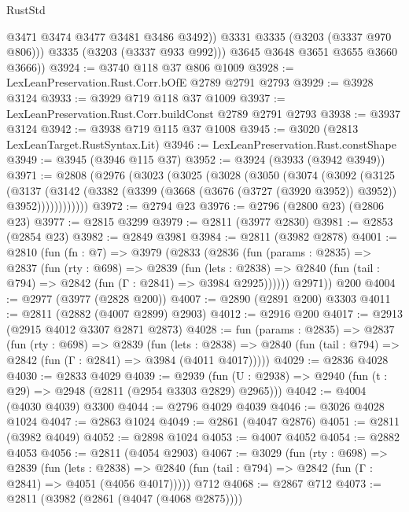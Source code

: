 \begin{lexlean}{RustStd}
\begin{coremodule}
                @3471
                @3474
                @3477
                @3481
                @3486
                @3492))
            @3331
            @3335
            (@3203 (@3337 @970 @806)))
          @3335
          (@3203 (@3337 @933 @992)))
        @3645
        @3648
        @3651
        @3655
        @3660
        @3666))
@3924 := @3740 @118 @37 @806 @1009
@3928 := LexLeanPreservation.Rust.Corr.bOfE @2789 @2791 @2793
@3929 := @3928 @3124
@3933 := @3929 @719 @118 @37 @1009
@3937 := LexLeanPreservation.Rust.Corr.buildConst @2789 @2791 @2793
@3938 := @3937 @3124
@3942 := @3938 @719 @115 @37 @1008
@3945 := @3020 (@2813 LexLeanTarget.RustSyntax.Lit)
@3946 := LexLeanPreservation.Rust.constShape
@3949 := @3945 (@3946 @115 @37)
@3952 := @3924 (@3933 (@3942 @3949))
@3971 := @2808
    (@2976
      (@3023
        (@3025
          (@3028
            (@3050
              (@3074
                (@3092
                  (@3125
                    (@3137
                      (@3142
                        (@3382 (@3399 (@3668 (@3676 (@3727 (@3920 @3952)) @3952)) @3952))))))))))))
@3972 := @2794 @23
@3976 := @2796 (@2800 @23) (@2806 @23)
@3977 := @2815 @3299
@3979 := @2811 (@3977 @2830)
@3981 := @2853 (@2854 @23)
@3982 := @2849 @3981
@3984 := @2811 (@3982 @2878)
@4001 := @2810
    (fun (fn : @7) =>
    @3979
      (@2833
        (@2836
          (fun (params : @2835) =>
          @2837
            (fun (rty : @698) =>
            @2839
              (fun (lets : @2838) =>
              @2840 (fun (tail : @794) => @2842 (fun (Γ : @2841) => @3984 @2925))))))
        @2971))
    @200
@4004 := @2977 (@3977 (@2828 @200))
@4007 := @2890 (@2891 @200) @3303
@4011 := @2811 (@2882 (@4007 @2899) @2903)
@4012 := @2916 @200
@4017 := @2913 (@2915 @4012 @3307 @2871 @2873)
@4028 := fun (params : @2835) =>
  @2837
    (fun (rty : @698) =>
    @2839
      (fun (lets : @2838) =>
      @2840 (fun (tail : @794) => @2842 (fun (Γ : @2841) => @3984 (@4011 @4017)))))
@4029 := @2836 @4028
@4030 := @2833 @4029
@4039 := @2939 (fun (U : @2938) => @2940 (fun (t : @29) => @2948 (@2811 (@2954 @3303 @2829) @2965)))
@4042 := @4004 (@4030 @4039) @3300
@4044 := @2796 @4029 @4039
@4046 := @3026 @4028 @1024
@4047 := @2863 @1024
@4049 := @2861 (@4047 @2876)
@4051 := @2811 (@3982 @4049)
@4052 := @2898 @1024
@4053 := @4007 @4052
@4054 := @2882 @4053
@4056 := @2811 (@4054 @2903)
@4067 := @3029
    (fun (rty : @698) =>
    @2839
      (fun (lets : @2838) =>
      @2840 (fun (tail : @794) => @2842 (fun (Γ : @2841) => @4051 (@4056 @4017)))))
    @712
@4068 := @2867 @712
@4073 := @2811 (@3982 (@2861 (@4047 (@4068 @2875))))

\end{coremodule}
\end{lexlean}
